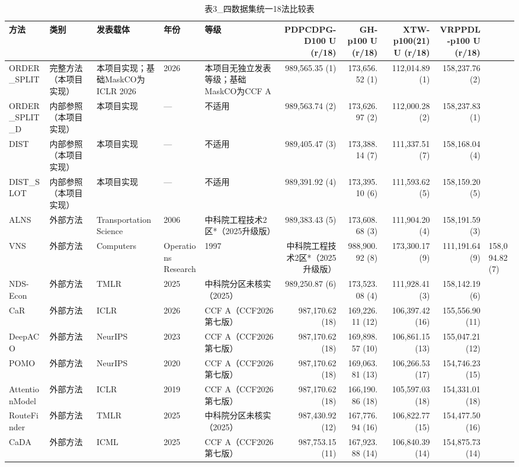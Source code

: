 \begin{table}[t]
\centering
\caption{表3_四数据集统一18法比较表}
\label{tab:表3_四数据集统一18法比较表}
\begin{tabular}{lllllrrrr}
\toprule
方法 & 类别 & 发表载体 & 年份 & 等级 & PDPCDPG-D100 U (r/18) & GH-p100 U (r/18) & XTW-p100(21) U (r/18) & VRPPDL-p100 U (r/18) \\
\midrule
ORDER_SPLIT & 完整方法（本项目实现） & 本项目实现；基础MaskCO为ICLR 2026 & 2026 & 本项目无独立发表等级；基础MaskCO为CCF A & 989,565.35 (1) & 173,656.52 (1) & 112,014.89 (1) & 158,237.76 (2) \\
ORDER_SPLIT_D & 内部参照（本项目实现） & 本项目实现 & — & 不适用 & 989,563.74 (2) & 173,626.97 (2) & 112,000.28 (2) & 158,237.83 (1) \\
DIST & 内部参照（本项目实现） & 本项目实现 & — & 不适用 & 989,405.47 (3) & 173,388.14 (7) & 111,337.51 (7) & 158,168.04 (4) \\
DIST_SLOT & 内部参照（本项目实现） & 本项目实现 & — & 不适用 & 989,391.92 (4) & 173,395.10 (6) & 111,593.62 (5) & 158,159.20 (5) \\
ALNS & 外部方法 & Transportation Science & 2006 & 中科院工程技术2区*（2025升级版） & 989,383.43 (5) & 173,608.68 (3) & 111,904.20 (4) & 158,191.59 (3) \\
VNS & 外部方法 & Computers & Operations Research & 1997 & 中科院工程技术2区*（2025升级版） & 988,900.92 (8) & 173,300.17 (9) & 111,191.64 (9) & 158,094.82 (7) \\
NDS-Econ & 外部方法 & TMLR & 2025 & 中科院分区未核实（2025） & 989,250.87 (6) & 173,523.08 (4) & 111,928.41 (3) & 158,142.19 (6) \\
CaR & 外部方法 & ICLR & 2026 & CCF A（CCF2026第七版） & 987,170.62 (18) & 169,226.11 (12) & 106,397.42 (16) & 155,556.90 (11) \\
DeepACO & 外部方法 & NeurIPS & 2023 & CCF A（CCF2026第七版） & 987,170.62 (18) & 169,898.57 (10) & 106,861.15 (13) & 155,047.21 (12) \\
POMO & 外部方法 & NeurIPS & 2020 & CCF A（CCF2026第七版） & 987,170.62 (18) & 169,063.81 (13) & 106,266.53 (17) & 154,746.23 (15) \\
AttentionModel & 外部方法 & ICLR & 2019 & CCF A（CCF2026第七版） & 987,170.62 (18) & 166,190.86 (18) & 105,597.03 (18) & 154,331.01 (18) \\
RouteFinder & 外部方法 & TMLR & 2025 & 中科院分区未核实（2025） & 987,430.92 (12) & 167,776.94 (16) & 106,822.77 (15) & 154,477.50 (16) \\
CaDA & 外部方法 & ICML & 2025 & CCF A（CCF2026第七版） & 987,753.15 (11) & 167,923.88 (14) & 106,840.39 (14) & 154,875.73 (14) \\

\end{tabular}
\end{table}
